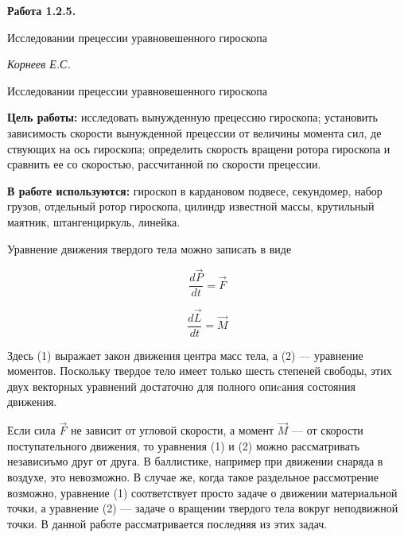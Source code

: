 \documentclass[14pt]{article}
\begin{document}
\begin{titlepage}
	\begin{center}
		\fontsize{18pt}{20pt}\selectfont
		\textbf{Работа 1.2.5.}	
	
		\vspace{5cm}
		\fontsize{24pt}{25pt}\selectfont
		Исследовании прецессии уравновешенного гироскопа
	\end{center}
	\begin{flushright}
		\fontsize{18pt}{20pt}\selectfont
		\vspace{14cm}
		\hspace{-3cm}
		\textit{Корнеев Е.С.}
	\end{flushright}		
\end{titlepage}

\begin{center}
	\fontsize{16pt}{18pt}\selectfont	
	Исследовании прецессии уравновешенного гироскопа
\end{center}

\fontsize{14pt}{16pt}\selectfont
\vspace{1cm}
\textbf{Цель работы:} исследовать вынужденную прецессию гироскопа; установить зависимость скорости вынужденной прецессии от величины момента сил, де	ствующих на ось гироскопа; определить скорость вращени ротора гироскопа и сравнить ее со скоростью, рассчитанной по скорости прецессии.

\vspace{0.5cm}
\textbf{В работе используются:} гироскоп в кардановом подвесе, секундомер, набор грузов, отдельный ротор гироскопа, цилиндр известной массы, крутильный маятник, штангенциркуль, линейка.

\vspace{1cm}
Уравнение движения твердого тела можно записать в виде

\begin{equation}
\frac{d\vec{P}}{dt} = \vec{F}
\end{equation}

\begin{equation}
\frac{d\vec{L}}{dt} = \vec{M}
\end{equation}

Здесь (1) выражает закон движения центра масс тела, а (2) --- уравнение моментов. Поскольку твердое тело имеет только шесть степеней свободы, этих двух векторных уравнений достаточно для полного опиcания состояния движения.

Если сила $\vec{F}$ не зависит от угловой скорости, а момент $\vec{M}$ --- от скорости поступательного движения, то уравнения (1) и (2) можно рассматривать независиъмо друг от друга. В баллистике, например при движении снаряда в воздухе, это невозможно. В случае же, когда такое раздельное рассмотрение возможно, уравнение (1) соответствует просто задаче о движении материальной точки, а уравнение (2) --- задаче о вращении твердого тела вокруг неподвижной точки. В данной работе рассматривается последняя из этих задач.
\end{document}

